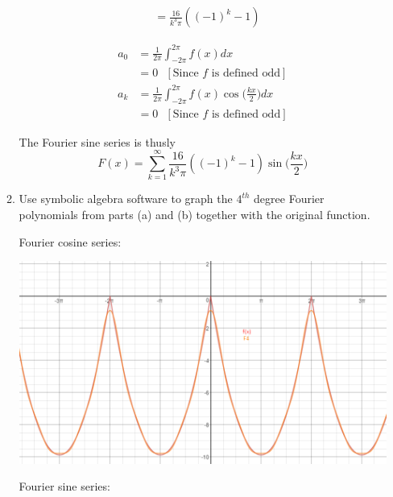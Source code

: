 \documentclass{article}
\begin{document}
\begin{enumerate}
\begin{enumerate}
\begin{align*}
    &= \frac{16}{k^3\pi}((-1)^k - 1)
\end{align*} 
\begin{multicols}{2} 
\noindent
\begin{align*}
    a_0 &= \frac{1}{2\pi} \int_{-2\pi}^{2\pi}f(x) dx \\
    &= 0 \: \: \: [\text{Since $f$ is defined odd}]
\end{align*} 
\begin{align*}
    a_k &= \frac{1}{2\pi} \int_{-2\pi}^{2\pi}f(x)\cos\Big(\frac{kx}{2}\Big) dx \\
    &= 0 \: \: \: [\text{Since $f$ is defined odd}]
\end{align*} 
\end{multicols}

The Fourier sine series is thusly 
        \[ F(x) = \sum_{k=1}^{\infty} \frac{16}{k^3\pi}((-1)^k-1)\sin\Big(\frac{kx}{2}\Big) \]
\item Use symbolic algebra software to graph the $4^{th}$ degree Fourier polynomials from parts (a) and (b) together with the original function.

    Fourier cosine series:

        \includegraphics[width=\textwidth]{b42-a2-5a}

    Fourier sine series:


\end{enumerate}
\end{enumerate}
\end{document}
